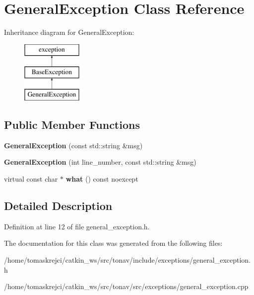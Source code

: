 \hypertarget{class_general_exception}{\section{General\-Exception Class Reference}
\label{class_general_exception}
}
Inheritance diagram for General\-Exception\-:\begin{figure}[H]
\begin{center}
\leavevmode
\includegraphics[height=3.000000cm]{class_general_exception}
\end{center}
\end{figure}
\subsection*{Public Member Functions}
\begin{DoxyCompactItemize}
\item 
\hypertarget{class_general_exception_ae9a9599d82aa29bef098dbb594e2f13e}{{\bfseries General\-Exception} (const std\-::string \&msg)}\label{class_general_exception_ae9a9599d82aa29bef098dbb594e2f13e}

\item 
\hypertarget{class_general_exception_ab6bb7c8ae3ab248e082d7fbf3f4a2cf3}{{\bfseries General\-Exception} (int line\-\_\-number, const std\-::string \&msg)}\label{class_general_exception_ab6bb7c8ae3ab248e082d7fbf3f4a2cf3}

\item 
\hypertarget{class_general_exception_a1d8d27063e77fe4658daa8279d0af52c}{virtual const char $\ast$ {\bfseries what} () const noexcept}\label{class_general_exception_a1d8d27063e77fe4658daa8279d0af52c}

\end{DoxyCompactItemize}


\subsection{Detailed Description}


Definition at line 12 of file general\-\_\-exception.\-h.



The documentation for this class was generated from the following files\-:\begin{DoxyCompactItemize}
\item 
/home/tomaskrejci/catkin\-\_\-ws/src/tonav/include/exceptions/general\-\_\-exception.\-h\item 
/home/tomaskrejci/catkin\-\_\-ws/src/tonav/src/exceptions/general\-\_\-exception.\-cpp\end{DoxyCompactItemize}
